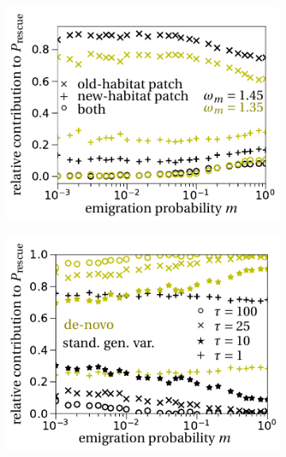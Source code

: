 \documentclass[11pt]{article}
\begin{document}
\begin{figure}[t]
	\centering
		\begin{subfigure}{.5\textwidth}
 		 \centering
 		 \includegraphics[width=\linewidth]{fig6a.pdf}
  		\caption{}
	\end{subfigure}%
    \begin{subfigure}{.5\textwidth}
 		 \centering
 		 \includegraphics[width=\linewidth]{fig6b.pdf}
  		\caption{}
	\end{subfigure}

\end{figure}
\end{document}
